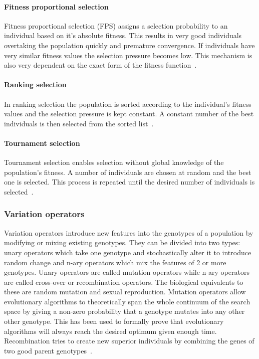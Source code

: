 \paragraph{Fitness proportional selection}

Fitness proportional selection (FPS) assigns a selection probability to an individual based on it's absolute fitness. This results in very good individuals overtaking the population quickly and premature convergence. If individuals have very similar fitness values the selection pressure becomes low. This mechanism is also very dependent on the exact form of the fitness function~\cite{Eiben2015asdfasd}.

\paragraph{Ranking selection}

In ranking selection the population is sorted according to the individual's fitness values and the selection pressure is kept constant. A constant number of the best individuals is then selected from the sorted list~\cite{Eiben2015asdfasd}.

\paragraph{Tournament selection}

Tournament selection enables selection without global knowledge of the population's fitness. A number of individuals are chosen at random and the best one is selected. This process is repeated until the desired number of individuals is selected~\cite{Eiben2015asdfasd}.


\subsubsection{Variation operators}

Variation operators introduce new features into the genotypes of a population by modifying or mixing existing genotypes. They can be divided into two types: unary operators which take one genotype and stochastically alter it to introduce random change and n-ary operators which mix the features of 2 or more genotypes. Unary operators are called mutation operators while n-ary operators are called cross-over or recombination operators. The biological equivalents to these are random mutation and sexual reproduction. Mutation operators allow evolutionary algorithms to theoretically span the whole continuum of the search space by giving a non-zero probability that a genotype mutates into any other other genotype. This has been used to formally prove that evolutionary algorithms will always reach the desired optimum given enough time. Recombination tries to create new superior individuals by combining the genes of two good parent genotypes~\cite{Eiben2015_whatevolutionary, Eiben20021}.

